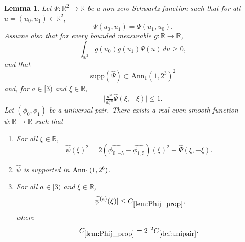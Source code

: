 \documentclass[12pt,reqno]{amsart}
\theoremstyle{plain}
\newtheorem{lemma}[theorem]{Lemma}
\numberwithin{equation}{section}
\theoremstyle{remark}
\newcommand{\uses}[1]{}
\newcommand{\usesdefs}[1]{}
\newcommand{\R}{{\mathbb R}}
\begin{document}
\begin{lemma}
\label{lem:Phij_prop}\uses{lem:Phipos_v2}\usesdefs{def:cn-window,def:unipair}
Let $\Psi:\mathbb{R}^2\to\mathbb{R}$ be a non-zero Schwartz function such that for all $u=(u_0,u_1)\in\R^2$,
\begin{equation}\label{auto:Phij-symmetry-assumption}
\Psi(u_0,u_1)=\Psi(u_1,u_0).
\end{equation}
Assume also that for every bounded measurable $g:\R\to\R$,
\begin{equation}\label{auto:Phij-positivity-assumption}
\int_{\R^2}g(u_0)g(u_1)\Psi(u)\,du\ge0,
\end{equation}
and that
\begin{equation}\label{auto:Phij-Fourier-support-assumption}
\mathrm{supp}(\widehat{\Psi}) \subset \mathrm{Ann}_1(1, 2^3)^2
\end{equation}
and, for $a\in [3)$ and $\xi \in \R$,
\begin{equation}\label{Phij_psi_der}
\Big|\tfrac{d^a}{d\xi^{a}} \widehat{\Psi}(\xi,-\xi)\Big| \leq 1.
\end{equation}
Let $(\phi_0,\phi_1)$ be a universal pair. There exists a real even smooth function $\psi:\R\to \R$ such that
\begin{enumerate}
\item For all $\xi\in\R$,
\begin{equation}\label{Phij_psi_diag}
\widehat{\psi}(\xi)^2 = 2 (\widehat{\phi_{0,-5}}-\widehat{\phi_{1,5}})(\xi)^2 - \widehat{\Psi}(\xi,-\xi).
\end{equation}
\item $\widehat{\psi}$ is supported in $\textup{Ann}_1(1,2^6)$.
\item For all $a\in [3)$ and $\xi\in \R$,
\begin{equation}\label{psi_decay}
|\widehat{\psi}^{(a)}(\xi)|\le C_{\ref{lem:Phij_prop}},
\end{equation}
where
\begin{equation}\label{auto:Phij-constant-definition}
C_{\ref{lem:Phij_prop}}=2^{12}C_{\ref{def:unipair}}.
\end{equation}
\end{enumerate}
\end{lemma}
\end{document}
